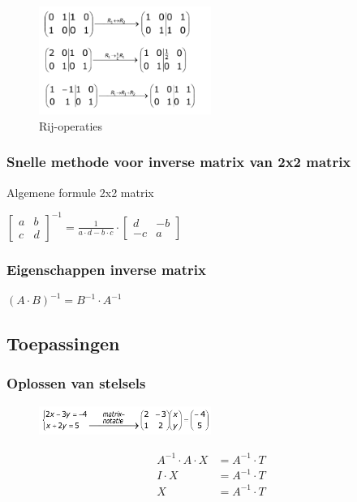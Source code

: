 \documentclass{article}
\begin{document}
\begin{figure}[H]
    \centering
    \includegraphics[width=0.5\textwidth]{inverse-matrix-berekenen.png}
    \caption{Rij-operaties}
\end{figure}

\subsubsection{Snelle methode voor inverse matrix van 2x2 matrix}

Algemene formule 2x2 matrix

$\begin{bmatrix}
a & b\\
c & d
\end{bmatrix}^{-1} = \frac{1}{a\cdot d - b\cdot c}\cdot 
\begin{bmatrix}
d & -b\\
-c & a
\end{bmatrix}$

\subsubsection{Eigenschappen inverse matrix}

$(A\cdot B)^{-1} = B^{-1}\cdot A^{-1}$



\subsection{Toepassingen}

\subsubsection{Oplossen van stelsels}

\begin{figure}[H]
    \centering
    \includegraphics[width=0.5\textwidth]{matrix-oplossen.png}
\end{figure}

\begin{align*}
    A^{-1} \cdot A \cdot X & = A^{-1}\cdot T\\
    I\cdot X & = A^{-1} \cdot T\\
    X & = A^{-1}\cdot T
\end{align*}
\end{document}
